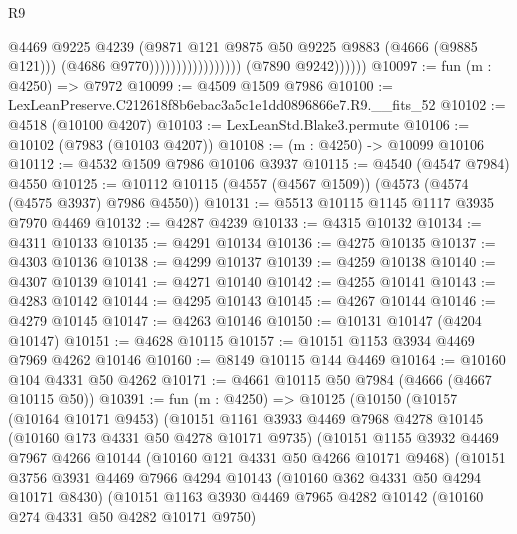\begin{lexlean}{R9}
\begin{coremodule}
                                              @4469
                                              @9225
                                              @4239
                                              (@9871
                                                @121
                                                @9875
                                                @50
                                                @9225
                                                @9883
                                                (@4666 (@9885 @121)))
                                              (@4686 @9770)))))))))))))))))
              (@7890 @9242))))))
@10097 := fun (m : @4250) => @7972
@10099 := @4509 @1509 @7986
@10100 := LexLeanPreserve.C212618f8b6ebac3a5c1e1dd0896866e7.R9.__fits_52
@10102 := @4518 (@10100 @4207)
@10103 := LexLeanStd.Blake3.permute
@10106 := @10102 (@7983 (@10103 @4207))
@10108 := (m : @4250) -> @10099 @10106
@10112 := @4532 @1509 @7986 @10106 @3937
@10115 := @4540 (@4547 @7984) @4550
@10125 := @10112 @10115 (@4557 (@4567 @1509)) (@4573 (@4574 (@4575 @3937) @7986 @4550))
@10131 := @5513 @10115 @1145 @1117 @3935 @7970 @4469
@10132 := @4287 @4239
@10133 := @4315 @10132
@10134 := @4311 @10133
@10135 := @4291 @10134
@10136 := @4275 @10135
@10137 := @4303 @10136
@10138 := @4299 @10137
@10139 := @4259 @10138
@10140 := @4307 @10139
@10141 := @4271 @10140
@10142 := @4255 @10141
@10143 := @4283 @10142
@10144 := @4295 @10143
@10145 := @4267 @10144
@10146 := @4279 @10145
@10147 := @4263 @10146
@10150 := @10131 @10147 (@4204 @10147)
@10151 := @4628 @10115
@10157 := @10151 @1153 @3934 @4469 @7969 @4262 @10146
@10160 := @8149 @10115 @144 @4469
@10164 := @10160 @104 @4331 @50 @4262
@10171 := @4661 @10115 @50 @7984 (@4666 (@4667 @10115 @50))
@10391 := fun (m : @4250) =>
  @10125
    (@10150
      (@10157
        (@10164 @10171 @9453)
        (@10151
          @1161
          @3933
          @4469
          @7968
          @4278
          @10145
          (@10160 @173 @4331 @50 @4278 @10171 @9735)
          (@10151
            @1155
            @3932
            @4469
            @7967
            @4266
            @10144
            (@10160 @121 @4331 @50 @4266 @10171 @9468)
            (@10151
              @3756
              @3931
              @4469
              @7966
              @4294
              @10143
              (@10160 @362 @4331 @50 @4294 @10171 @8430)
              (@10151
                @1163
                @3930
                @4469
                @7965
                @4282
                @10142
                (@10160 @274 @4331 @50 @4282 @10171 @9750)

\end{coremodule}
\end{lexlean}
